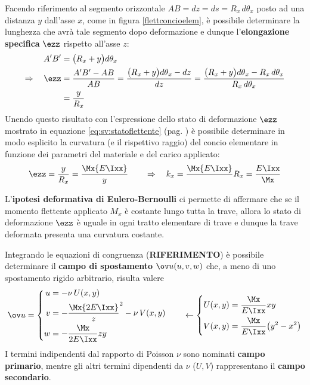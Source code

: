 		Facendo riferimento al segmento orizzontale $AB = dz = ds =R_x\, d\theta_x$ posto ad una distanza $y$ dall'asse $x$, come in figura \ref{flettconcioelem}, è possibile determinare la lunghezza che avrà tale segmento dopo deformazione e dunque l'\textbf{elongazione specifica} $\ezz$ rispetto all'asse $z$:
		\begin{align*}
			A'B' & = \big(R_x + y\big) d\theta_x \\
			\Rightarrow \quad \ezz  & = \frac{A'B'-AB}{AB} = \frac{\big(R_x+y\big) d\theta_x - dz }{dz} = \frac{\big(R_x + y\big)d\theta_x - R_x \, d\theta_x}{R_x \, d\theta_x} \\
			& = \frac y {R_x}
		\end{align*}
		Unendo questo risultato con l'espressione dello stato di deformazione $\ezz$ mostrato in equazione \ref{eq:sv:statoflettente} (pag. \pageref{eq:sv:statoflettente}) è possibile determinare in modo esplicito la curvatura (e il rispettivo raggio) del concio elementare in funzione dei parametri del materiale e del carico applicato:
		\begin{equation}
			\ezz = \frac y {R_x} =\frac \Mx{E\Ixx} y \qquad \Rightarrow \quad k_x = \frac \Mx{E\Ixx} \qquad R_x = \frac {E\Ixx} \Mx
		\end{equation}
		\begin{concetto}
			L'\textbf{ipotesi deformativa di Eulero-Bernoulli} ci permette di affermare che se il momento flettente applicato $M_x$ è costante lungo tutta la trave, allora lo stato di deformazione $\ezz$ è uguale in ogni tratto elementare di trave e dunque la trave deformata presenta una curvatura costante.
		\end{concetto}
		\begin{concetto}
			Integrando le equazioni di congruenza (\textbf{RIFERIMENTO}) è possibile determinare il \textbf{campo di spostamento} $\ov u(u,v,w)$ che, a meno di uno spostamento rigido arbitrario, risulta valere
			\begin{equation} \label{eq:sv:campoflessione}
			\ov u = \left\{ 
			\begin{split}
				u &= -\nu \, U(x,y) \\
				v &= -\frac \Mx {2E\Ixx} z^2 - \nu \, V(x,y) \\
				w &= - \frac{\Mx}{2E\Ixx} zy
			\end{split}\right.
			\qquad \leftarrow \left\{ 
			\begin{split}
				U(x,y) & = \frac{\Mx}{E\Ixx} xy \\
				V(x,y) & = \frac{\Mx}{E\Ixx} \big(y^2 - x^2\big) \\
			\end{split}\right.
			\end{equation}
			I termini indipendenti dal rapporto di Poisson $\nu$ sono nominati \textbf{campo primario}, mentre gli altri termini dipendenti da $\nu$ ($U,V$) rappresentano il \textbf{campo secondario}.
		\end{concetto}
		
